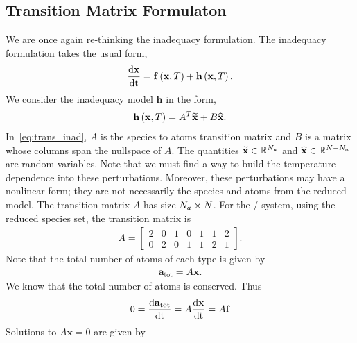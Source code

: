 \subsection{Transition Matrix Formulaton}
We are once again re-thinking the inadequacy formulation.  The inadequacy 
formulation takes the usual form,
\begin{align}
  \frac{\mathrm{d} \mathbf{x}}{\mathrm{d} \mathrm{t}} = \mathbf{f}\left(\mathbf{x}, T\right) + \mathbf{h}\left(\mathbf{x}, T\right).
\end{align}
We consider the inadequacy model $\mathbf{h}$ in the form,
\begin{align}
  \mathbf{h}\left(\mathbf{x}, T\right) = A^{T}\widetilde{\mathbf{x}} + B\widehat{\mathbf{x}}.
  \label{eq:trans_inad}
\end{align}
In~\eqref{eq:trans_inad}, $A$ is the species to atoms transition matrix and 
$B$ is a matrix whose columns span the nullspace of $A$.  The quantities 
$\widetilde{\mathbf{x}}\in\mathbb{R}^{N_{a}}$ and 
$\widehat{\mathbf{x}}\in\mathbb{R}^{N-N_{a}}$ are random variables. 
Note that we must find a way to build the temperature dependence into 
these perturbations.  Moreover, these perturbations may have a nonlinear 
form; they are not necessarily the species and atoms from the reduced model.  
The transition matrix $A$ has size $N_{a}\times N$. 
For the / system, using the reduced species set, the 
transition matrix is
\begin{align}
  A = 
  \begin{bmatrix}
    2 & 0 & 1 & 0 & 1 & 1 & 2 \\
    0 & 2 & 0 & 1 & 1 & 2 & 1
  \end{bmatrix}.
\end{align}
Note that the total number of atoms of each type is given by 
\begin{align}
  \mathbf{a}_{\textrm{tot}} = A\mathbf{x}.
\end{align}
We know that the total number of atoms is conserved.
Thus
\begin{align}
  0 = \frac{\mathrm{d} \mathbf{a}_{\textrm{tot}}}{\mathrm{d} \mathrm{t}} = 
  A \frac{\mathrm{d} \mathbf{x}}{\mathrm{d} \mathrm{t}} = A\mathbf{f}
\end{align}
Solutions to $A\mathbf{x} = 0$ are given by 

